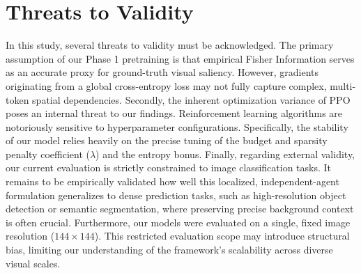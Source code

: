 \section{Threats to Validity}
In this study, several threats to validity must be acknowledged. The primary assumption of our Phase 1 pretraining is that empirical Fisher Information serves as an accurate proxy for ground-truth visual saliency. However, gradients originating from a global cross-entropy loss may not fully capture complex, multi-token spatial dependencies.
Secondly, the inherent optimization variance of PPO poses an internal threat to our findings. Reinforcement learning algorithms are notoriously sensitive to hyperparameter configurations. Specifically, the stability of our model relies heavily on the precise tuning of the budget and sparsity penalty coefficient ($\lambda$) and the entropy bonus.
Finally, regarding external validity, our current evaluation is strictly constrained to image classification tasks. It remains to be empirically validated how well this localized, independent-agent formulation generalizes to dense prediction tasks, such as high-resolution object detection or semantic segmentation, where preserving precise background context is often crucial. Furthermore, our models were evaluated on a single, fixed image resolution ($144 \times 144$). This restricted evaluation scope may introduce structural bias, limiting our understanding of the framework's scalability across diverse visual scales.
